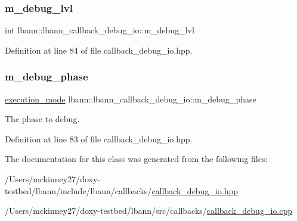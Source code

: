 \subsubsection{\texorpdfstring{m\+\_\+debug\+\_\+lvl}{m\_debug\_lvl}}
{\footnotesize\ttfamily int lbann\+::lbann\+\_\+callback\+\_\+debug\+\_\+io\+::m\+\_\+debug\+\_\+lvl\hspace{0.3cm}{\ttfamily [private]}}



Definition at line 84 of file callback\+\_\+debug\+\_\+io.\+hpp.

\mbox{\label{classlbann_1_1lbann__callback__debug__io_add73fbc786ca9284fa3399a7e99d0b1f}} 
\subsubsection{\texorpdfstring{m\+\_\+debug\+\_\+phase}{m\_debug\_phase}}
{\footnotesize\ttfamily \hyperlink{base_8hpp_a2781a159088df64ed7d47cc91c4dc0a8}{execution\+\_\+mode} lbann\+::lbann\+\_\+callback\+\_\+debug\+\_\+io\+::m\+\_\+debug\+\_\+phase\hspace{0.3cm}{\ttfamily [private]}}

The phase to debug. 

Definition at line 83 of file callback\+\_\+debug\+\_\+io.\+hpp.



The documentation for this class was generated from the following files\+:\begin{DoxyCompactItemize}
\item 
/\+Users/mckinney27/doxy-\/testbed/lbann/include/lbann/callbacks/\hyperlink{callback__debug__io_8hpp}{callback\+\_\+debug\+\_\+io.\+hpp}\item 
/\+Users/mckinney27/doxy-\/testbed/lbann/src/callbacks/\hyperlink{callback__debug__io_8cpp}{callback\+\_\+debug\+\_\+io.\+cpp}\end{DoxyCompactItemize}
